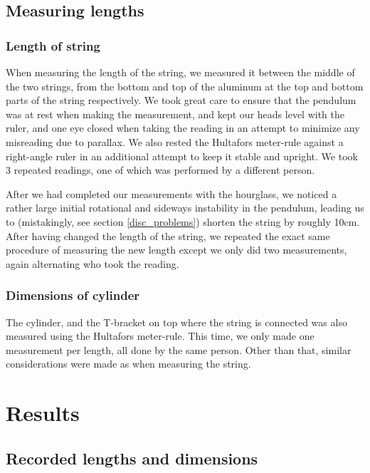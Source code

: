 \documentclass[%
 reprint,
 amsmath,amssymb,
 aps,
]{revtex4-1}
\begin{document}
        \subsection{Measuring lengths}
            \subsubsection{\label{subsubsect:strings}Length of string}
                When measuring the length of the string, we measured it between the middle of the two strings, from the bottom and top of the aluminum at the top and bottom parts of the string respectively. We took great care to ensure that the pendulum was at rest when making the measurement, and kept our heads level with the ruler, and one eye closed when taking the reading in an attempt to minimize any misreading due to parallax. We also rested the Hultafors meter-rule against a right-angle ruler in an additional attempt to keep it stable and upright. We took 3 repeated readings, one of which was performed by a different person. 

                After we had completed our measurements with the hourglass, we noticed a rather large initial rotational and sideways instability in the pendulum, leading us to (mistakingly, see section \ref{disc_problems}) shorten the string by roughly 10cm. After having changed the length of the string, we repeated the exact same procedure of measuring the new length except we only did two measurements, again alternating who took the reading.

            \subsubsection{\label{subsubsect:dim_cyllinder}Dimensions of cylinder}
                The cylinder, and the T-bracket on top where the string is connected was also measured using the Hultafors meter-rule. This time, we only made one measurement per length, all done by the same person. Other than that, similar considerations were made as when measuring the string.





\section{\label{sect:results}Results}
   
    \subsection{Recorded lengths and dimensions}
\end{document}
